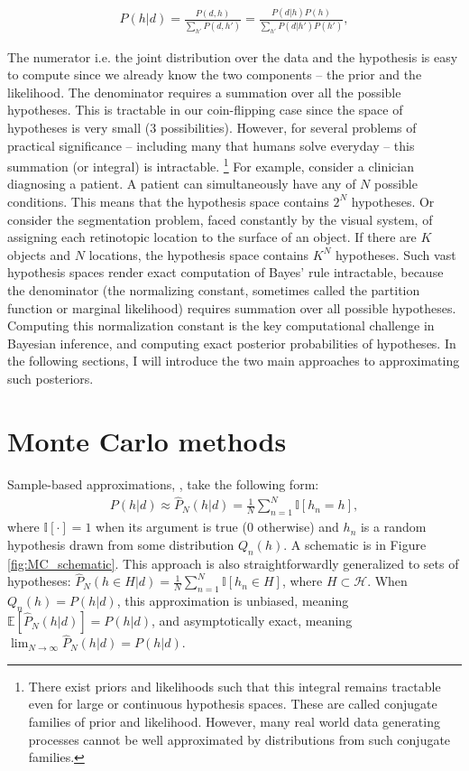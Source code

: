 \begin{align}
    P(h|d) = \frac{P(d, h)}{\sum_{h'} P(d, h')} = \frac{P(d|h)P(h)}{\sum_{h'} P(d|h') P(h')},
\end{align}

The numerator i.e. the joint distribution over the data and the hypothesis is easy to compute since we already know the two components -- the prior and the likelihood. The denominator requires a summation over all the possible hypotheses. This is tractable in our coin-flipping case since the space of hypotheses is very small (3 possibilities). However, for several problems of practical significance -- including many that humans solve everyday -- this summation (or integral) is intractable. \footnote{There exist priors and likelihoods such that this integral remains tractable even for large or continuous hypothesis spaces. These are called conjugate families of prior and likelihood. However, many real world data generating processes cannot be well approximated by distributions from such conjugate families.}  For example, consider a clinician diagnosing a patient. A patient can simultaneously have any of $N$ possible conditions. This means that the hypothesis space contains $2^N$ hypotheses. Or consider the segmentation problem, faced constantly by the visual system, of assigning each retinotopic location to the surface of an object. If there are $K$ objects and $N$ locations, the hypothesis space contains $K^N$ hypotheses. Such vast hypothesis spaces render exact computation of Bayes' rule intractable, because the denominator (the normalizing constant, sometimes called the partition function or marginal likelihood) requires summation over all possible hypotheses. Computing this normalization constant is the key computational challenge in Bayesian inference, and computing exact posterior probabilities of hypotheses. In the following sections, I will introduce the two main approaches to approximating such posteriors.

\section{Monte Carlo methods}
\label{sec:approx_MC}

Sample-based approximations, \citep[also known as \emph{Monte Carlo} approximations][]{robert13}, take the following form:
\begin{align}
P(h|d) \approx \hat{P}_N(h|d) = \frac{1}{N}\sum_{n=1}^N \mathbb{I}[h_n=h],
\end{align}
where $\mathbb{I}[\cdot]=1$ when its argument is true (0 otherwise) and $h_n$ is a random hypothesis drawn from some distribution $Q_n(h)$. A schematic is in Figure \ref{fig:MC_schematic}. This approach is also straightforwardly generalized to sets of hypotheses: $\hat{P}_N(h \in H|d) = \frac{1}{N}\sum_{n=1}^N \mathbb{I}[h_n \in H]$, where $H \subset \mathcal{H}$. When $Q_n(h) = P(h|d)$, this approximation is unbiased, meaning $\mathbb{E}[\hat{P}_N(h|d)] = P(h|d)$, and asymptotically exact, meaning $\lim_{N\rightarrow \infty} \hat{P}_N(h|d) = P(h|d)$.



